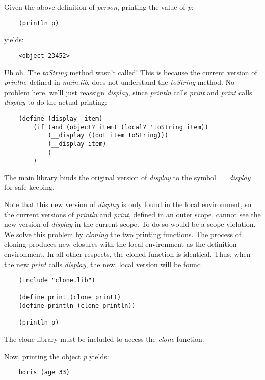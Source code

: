 Given the above definition of {\it person}, printing the value of {\it p}:

\begin{verbatim}
    (println p)
\end{verbatim}

yields:

\begin{verbatim}
    <object 23452>
\end{verbatim}

Uh oh. The {\it toString} method wasn't called! This is because
the current version of {\it println}, defined in {\it main.lib},
does not understand the {\it toString}
method. No problem here, we'll just reassign {\it display},
since {\it println} calls {\it print} and {\it print} calls {\it display}
to do the actual printing:

\begin{verbatim}
    (define (display  item)
        (if (and (object? item) (local? 'toString item))
            (__display ((dot item toString)))
            (__display item)
            )
        )
\end{verbatim}

The main library binds the original version of {\it display}
to the symbol {\it \_\_display} for
safe-keeping.

Note that this new version of {\it display} is only found in the local
environment, so the current versions of {\it println} and {\it print}, defined
in an outer scope, cannot see the new version of {\it display} in the current
scope.
To do so would be a scope violation.
We solve this problem by {\it cloning} the two printing functions.
The process of cloning produces new closures with 
the local environment as the definition environment.
In all other respects, the cloned function is identical.
Thus, when the new {\it print} calls {\it display}, the new, local version 
will be found.

\begin{verbatim}
    (include "clone.lib")

    (define print (clone print))
    (define println (clone println))

    (println p)
\end{verbatim}

The clone library must be included to access the {\it clone} function.

Now, printing the object {\it p} yields:

\begin{verbatim}
    boris (age 33)
\end{verbatim}
